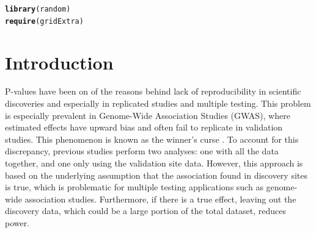 \documentclass[AMA,STIX1COL]{WileyNJD-v2}\usepackage[]{graphicx}\usepackage[]{color}
\makeatletter
\newcommand{\hlstd}[1]{\textcolor[rgb]{0.345,0.345,0.345}{#1}}%
\newcommand{\hlkwd}[1]{\textcolor[rgb]{0.737,0.353,0.396}{\textbf{#1}}}%
\newenvironment{kframe}{%
 \def\at@end@of@kframe{}%
 \ifinner\ifhmode%
  \def\at@end@of@kframe{\end{minipage}}%
  \begin{minipage}{\columnwidth}%
 \fi\fi%
 \def\FrameCommand##1{\hskip\@totalleftmargin \hskip-\fboxsep
 \colorbox{shadecolor}{##1}\hskip-\fboxsep
     \hskip-\linewidth \hskip-\@totalleftmargin \hskip\columnwidth}%
 \MakeFramed {\advance\hsize-\width
   \@totalleftmargin\z@ \linewidth\hsize
   \@setminipage}}%
 {\par\unskip\endMakeFramed%
 \at@end@of@kframe}
\newenvironment{knitrout}{}{} %
\makeatother
\begin{document}
\begin{knitrout}
\begin{kframe}
{\ttfamily\noindent\itshape\color{messagecolor}{\#\# \\\#\# Attaching package: 'R2jags'}}

{\ttfamily\noindent\itshape\color{messagecolor}{\#\# The following object is masked from 'package:coda':\\\#\# \\\#\#\ \ \ \  traceplot}}\begin{alltt}
\hlkwd{library}\hlstd{(random)}
\hlkwd{require}\hlstd{(gridExtra)}
\end{alltt}


{\ttfamily\noindent\itshape\color{messagecolor}{\#\# Loading required package: gridExtra}}\end{kframe}
\end{knitrout}

\section{Introduction}\label{sec:intro}

P-values have been on of the reasons behind lack of reproducibility in scientific discoveries and especially in replicated studies and multiple testing\cite{benjamin2017redefine}. This problem is especially prevalent in Genome-Wide Association Studies (GWAS), where estimated effects have upward bias and often fail to replicate in validation studies. This phenomenon is known as the winner's curse  \cite{zollner2007overcoming}. To account for this discrepancy, previous studies perform two analyses: one with all the data together, and one only using the validation site data. However, this approach is based on the underlying assumption that the association found in discovery sites is true, which is problematic for multiple testing applications such as genome-wide association studies. Furthermore, if there is a true effect, leaving out the discovery data, which could be a large portion of the total dataset, reduces power.
\end{document}
